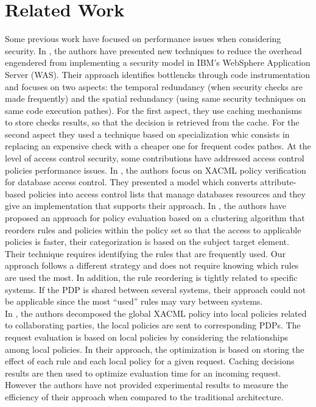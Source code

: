 \section{Related Work} \label{sec:related}

Some previous work have focused on performance issues when considering security.
In \cite{largesystems}, the authors have presented new techniques to reduce the overhead engendered from implementing a security model 
in IBM's WebSphere Application Server (WAS). Their approach identifies bottlencks through code instrumentation and focuses on two aspects: the temporal redundancy (when security checks are made frequently) and the spatial redundancy
(using same security techniques on same code execution pathes). For the first aspect, they use caching mechanisms to store checks results, so that the decision is retrieved from the cache.
For the second aspect they used a technique based on specialization whic consists in replacing an expensive check with a cheaper one for frequent codes pathes.
At the level of access control security, some contributions have addressed access control policies performance issues. In \cite{MyABDAC}, the authors focus on XACML
policy verification for database access control. They presented a model which converts attribute-based policies into access control lists that manage databases resources and they give an implementation 
that supports their approach.
 In \cite{clustering}, the authors have proposed an approach for policy evaluation based on a 
clustering algorithm that reorders rules and policies within the policy set so that the access to applicable policies is faster, their categorization is based on
 the subject target element. Their technique requires identifying the rules that are frequently used. Our approach follows a different strategy and does not require knowing which 
rules are used the most. In addition, the rule reordering is tightly related to specific systems. If the PDP is shared between several
 systems, their approach could not be applicable since the most ``used'' rules may vary between systems. \\
In \cite{decomposition}, 
the authors decomposed the global XACML policy into local policies related to collaborating parties, the local policies 
are sent to corresponding PDPs. The request evaluation is based on local policies by considering the relationships among local
 policies. In their approach, the optimization is based on storing the effect of each rule and each local policy for 
a given request. Caching decisions results are then used to optimize evaluation time for an incoming request. However the authors have 
not provided experimental results to measure the efficiency of their approach when compared to the traditional architecture.  

